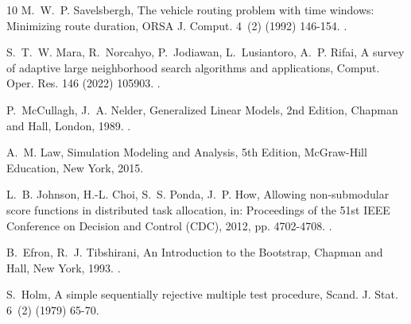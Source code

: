 \documentclass[a4paper,fleqn]{cas-dc}
\begin{document}
\begin{thebibliography}{10}
M.~W.~P. Savelsbergh, The vehicle routing problem with time windows: Minimizing
  route duration, ORSA J. Comput. 4~(2) (1992) 146-154.
\newblock \href {https://doi.org/10.1287/ijoc.4.2.146}
  {}.

S.~T.~W. Mara, R.~Norcahyo, P.~Jodiawan, L.~Lusiantoro, A.~P. Rifai, A survey
  of adaptive large neighborhood search algorithms and applications, Comput.
  Oper. Res. 146 (2022) 105903.
\newblock \href {https://doi.org/10.1016/j.cor.2022.105903}
  {}.

P.~McCullagh, J.~A. Nelder, Generalized Linear Models, 2nd Edition, Chapman and
  Hall, London, 1989.
\newblock \href {https://doi.org/10.1007/978-1-4899-3242-6}
  {}.

A.~M. Law, Simulation Modeling and Analysis, 5th Edition, McGraw-Hill
  Education, New York, 2015.

L.~B. Johnson, H.-L. Choi, S.~S. Ponda, J.~P. How, Allowing non-submodular
  score functions in distributed task allocation, in: Proceedings of the 51st
  IEEE Conference on Decision and Control (CDC), 2012, pp. 4702-4708.
\newblock \href {https://doi.org/10.1109/CDC.2012.6425867}
  {}.

B.~Efron, R.~J. Tibshirani, An Introduction to the Bootstrap, Chapman and Hall,
  New York, 1993.
\newblock \href {https://doi.org/10.1007/978-1-4899-4541-9}
  {}.

S.~Holm, A simple sequentially rejective multiple test procedure, Scand. J.
  Stat. 6~(2) (1979) 65-70.

\end{thebibliography}
\end{document}
